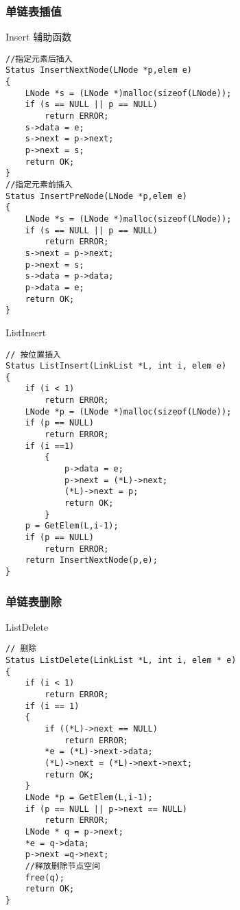 \subsubsection{单链表插值}
\begin{macbox}{Insert 辅助函数}
	\begin{verbatim}
//指定元素后插入
Status InsertNextNode(LNode *p,elem e)
{
    LNode *s = (LNode *)malloc(sizeof(LNode));
    if (s == NULL || p == NULL)
        return ERROR;
    s->data = e;
    s->next = p->next;
    p->next = s;
    return OK;
}
//指定元素前插入
Status InsertPreNode(LNode *p,elem e)
{
    LNode *s = (LNode *)malloc(sizeof(LNode));
    if (s == NULL || p == NULL)
        return ERROR;
    s->next = p->next;
    p->next = s;
    s->data = p->data;
    p->data = e;
    return OK;
}
    \end{verbatim}
\end{macbox}

\begin{macbox}{ListInsert}
	\begin{verbatim}
// 按位置插入
Status ListInsert(LinkList *L, int i, elem e)
{
    if (i < 1)
        return ERROR;
    LNode *p = (LNode *)malloc(sizeof(LNode));
    if (p == NULL)
        return ERROR;
    if (i ==1)
        {
            p->data = e;
            p->next = (*L)->next;
            (*L)->next = p;
            return OK;
        }
    p = GetElem(L,i-1);
    if (p == NULL)
        return ERROR;
    return InsertNextNode(p,e);
}
    \end{verbatim}
\end{macbox}
\subsubsection{单链表删除}
\begin{macbox}{ListDelete}
	\begin{verbatim}
// 删除
Status ListDelete(LinkList *L, int i, elem * e)
{
    if (i < 1)
        return ERROR;
    if (i == 1)
    {
        if ((*L)->next == NULL)
            return ERROR;
        *e = (*L)->next->data;
        (*L)->next = (*L)->next->next;
        return OK;
    }
    LNode *p = GetElem(L,i-1);
    if (p == NULL || p->next == NULL)
        return ERROR;
    LNode * q = p->next;
    *e = q->data;
    p->next =q->next;
    //释放删除节点空间
    free(q);
    return OK;
}
    \end{verbatim}
\end{macbox}
